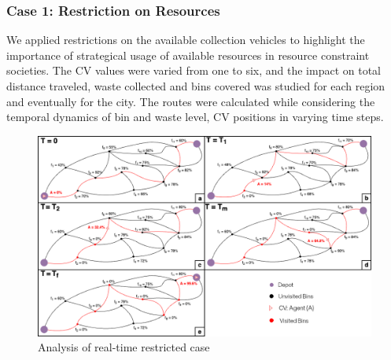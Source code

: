 \documentclass[12pt]{article}
\begin{document}
\subsubsection*{Case 1: Restriction on Resources}
We applied restrictions on the available collection vehicles to highlight the importance of strategical usage of available resources in resource constraint societies. The CV values were varied from one to six, and the impact on total distance traveled, waste collected and bins covered was studied for each region and eventually for the city. The routes were calculated while considering the temporal dynamics of bin and waste level, CV positions in varying time steps.
\begin{figure}[H]
    \centering
    \includegraphics[scale=1.35]{Combined graph Enlarged and table.png}
    \caption{Analysis of real-time restricted case}\label{figcom}
\end{figure}
\end{document}
